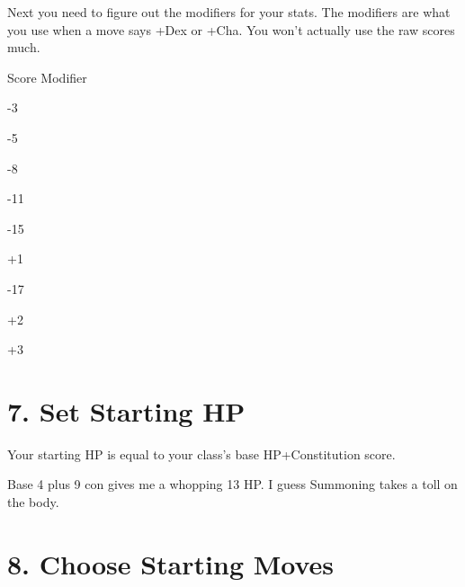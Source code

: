 Next you need to figure out the modifiers for your stats. The modifiers are what you use when a move says +Dex or +Cha. You won’t actually use the raw scores much.

        	  
\bTABLE
 		
\bTR
 \bTH			
 Score 	 
 \eTH		
\bTH
Modifier
\eTH
 		
\eTR
 		
\bTR

-3
\eTD

\eTD

\eTR
 		
\bTR

-5
\eTD

\eTD

\eTR
 		
\bTR

-8
\eTD

\eTD

\eTR
 		
\bTR

-11
\eTD

\eTD

\eTR
 		
\bTR

-15
\eTD

\bTD
+1
\eTD

\eTR
 		
\bTR

-17
\eTD

\bTD
+2
\eTD

\eTR
 		
\bTR

\eTD

\bTD
+3
\eTD

\eTR
 	  
\eTABLE
 	         
\section{7. Set Starting HP}     
       

Your starting HP is equal to your class's base HP+Constitution score.

       
\startExample
Base 4 plus 9 con gives me a whopping 13 HP. I guess Summoning takes a toll on the body.
\stopExample
       
\section{8. Choose Starting Moves}     
       

